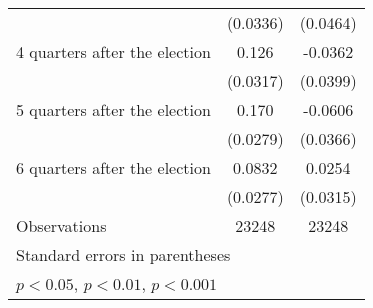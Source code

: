 \begin{table}[htbp]
\begin{tabular}{l*{2}{c}}
                    &    (0.0336)         &    (0.0464)         \\
[1em]
 4 quarters after the election&       0.126\sym{***}&     -0.0362         \\
                    &    (0.0317)         &    (0.0399)         \\
[1em]
 5 quarters after the election&       0.170\sym{***}&     -0.0606         \\
                    &    (0.0279)         &    (0.0366)         \\
[1em]
 6 quarters after the election&      0.0832\sym{**} &      0.0254         \\
                    &    (0.0277)         &    (0.0315)         \\
\hline
Observations        &       23248         &       23248         \\
\hline\hline
\multicolumn{3}{l}{\footnotesize Standard errors in parentheses}\\
\multicolumn{3}{l}{\footnotesize \sym{*} \(p<0.05\), \sym{**} \(p<0.01\), \sym{***} \(p<0.001\)}\\
\end{tabular}
\end{table}
